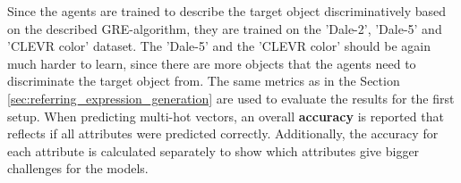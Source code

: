 Since the agents are trained to describe the target object discriminatively based on the described GRE-algorithm, they are trained on the 'Dale-2', 'Dale-5' and 'CLEVR color' dataset.
The 'Dale-5' and the 'CLEVR color' should be again much harder to learn, since there are more objects that the agents need to discriminate the target object from.
The same metrics as in the Section \ref{sec:referring_expression_generation} are used to evaluate the results for the first setup.
When predicting multi-hot vectors, an overall \textbf{accuracy} is reported that reflects if all attributes were predicted correctly.
Additionally, the accuracy for each attribute is calculated separately to show which attributes give bigger challenges for the models.

